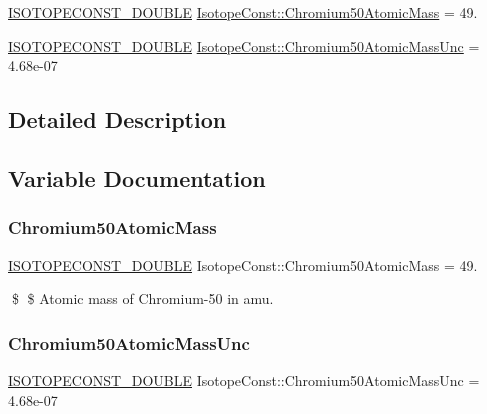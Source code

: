 \begin{DoxyCompactItemize}
\item 
\mbox{\hyperlink{group___isotope_const-_macros_ga8f45a7272ce02c0b4c65c44636ed719a}{I\+S\+O\+T\+O\+P\+E\+C\+O\+N\+S\+T\+\_\+\+D\+O\+U\+B\+LE}} \mbox{\hyperlink{group___isotope_const-_chromium-_cr50_ga6e96fe4b02f2fb154f49af723f443a80}{Isotope\+Const\+::\+Chromium50\+Atomic\+Mass}} = 49.
\item 
\mbox{\hyperlink{group___isotope_const-_macros_ga8f45a7272ce02c0b4c65c44636ed719a}{I\+S\+O\+T\+O\+P\+E\+C\+O\+N\+S\+T\+\_\+\+D\+O\+U\+B\+LE}} \mbox{\hyperlink{group___isotope_const-_chromium-_cr50_ga50a6d5a40569093e069c74985673bcce}{Isotope\+Const\+::\+Chromium50\+Atomic\+Mass\+Unc}} = 4.\+68e-\/07
\end{DoxyCompactItemize}


\subsection{Detailed Description}


\subsection{Variable Documentation}
\mbox{\label{group___isotope_const-_chromium-_cr50_ga6e96fe4b02f2fb154f49af723f443a80}} 
\subsubsection{\texorpdfstring{Chromium50\+Atomic\+Mass}{Chromium50AtomicMass}}
{\footnotesize\ttfamily \mbox{\hyperlink{group___isotope_const-_macros_ga8f45a7272ce02c0b4c65c44636ed719a}{I\+S\+O\+T\+O\+P\+E\+C\+O\+N\+S\+T\+\_\+\+D\+O\+U\+B\+LE}} Isotope\+Const\+::\+Chromium50\+Atomic\+Mass = 49.}

\$ \$ Atomic mass of Chromium-\/50 in amu. \mbox{\label{group___isotope_const-_chromium-_cr50_ga50a6d5a40569093e069c74985673bcce}} 
\subsubsection{\texorpdfstring{Chromium50\+Atomic\+Mass\+Unc}{Chromium50AtomicMassUnc}}
{\footnotesize\ttfamily \mbox{\hyperlink{group___isotope_const-_macros_ga8f45a7272ce02c0b4c65c44636ed719a}{I\+S\+O\+T\+O\+P\+E\+C\+O\+N\+S\+T\+\_\+\+D\+O\+U\+B\+LE}} Isotope\+Const\+::\+Chromium50\+Atomic\+Mass\+Unc = 4.\+68e-\/07}


